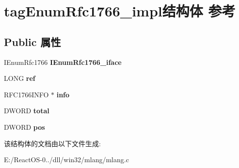 \hypertarget{structtag_enum_rfc1766__impl}{}\section{tag\+Enum\+Rfc1766\+\_\+impl结构体 参考}
\label{structtag_enum_rfc1766__impl}
\subsection*{Public 属性}
\begin{DoxyCompactItemize}
\item 
\mbox{\label{structtag_enum_rfc1766__impl_acece80c5d2643856df38e10f931c7e98}} 
I\+Enum\+Rfc1766 {\bfseries I\+Enum\+Rfc1766\+\_\+iface}
\item 
\mbox{\label{structtag_enum_rfc1766__impl_a9972f42cfb3856fc84089ef5004b4f2c}} 
L\+O\+NG {\bfseries ref}
\item 
\mbox{\label{structtag_enum_rfc1766__impl_abe426af2cb8066147e12e828ab4b3c42}} 
R\+F\+C1766\+I\+N\+FO $\ast$ {\bfseries info}
\item 
\mbox{\label{structtag_enum_rfc1766__impl_a8d3bec61601a2e830522d8e07a0ccbb9}} 
D\+W\+O\+RD {\bfseries total}
\item 
\mbox{\label{structtag_enum_rfc1766__impl_a9c06d366cc0eacf9fd4476629e2499ca}} 
D\+W\+O\+RD {\bfseries pos}
\end{DoxyCompactItemize}


该结构体的文档由以下文件生成\+:\begin{DoxyCompactItemize}
\item 
E\+:/\+React\+O\+S-\/0../dll/win32/mlang/mlang.\+c\end{DoxyCompactItemize}

